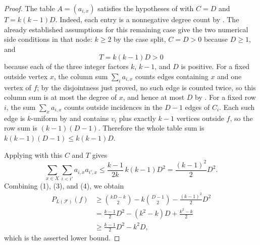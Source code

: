 \begin{proof}
The table $A=(a_{i,x})$ satisfies the hypotheses of
 with $C=D$ and $T=k(k-1)D$.  Indeed, each
entry is a nonnegative degree count by .  The
already established assumptions for this remaining case give the two
numerical side conditions in that node: $k\ge2$ by the case split,
$C=D>0$ because $D\ge1$, and
\[
T=k(k-1)D>0
\]
because each of the three integer factors $k$, $k-1$, and $D$ is positive.
For a
fixed outside vertex $x$, the column sum
$\sum_i a_{i,x}$ counts edges containing $x$ and one vertex of $f$; by the
disjointness just proved, no such edge is counted twice, so this column sum
is at most the degree of $x$, and hence at most $D$ by
.  For a fixed row $i$, the sum
$\sum_x a_{i,x}$ counts outside incidences in the $D-1$ edges of
$C_i$.  Each such edge is $k$-uniform by  and
contains $v_i$ plus exactly $k-1$ vertices outside $f$, so the row sum is
$(k-1)(D-1)$.  Therefore the whole table sum is
$k(k-1)(D-1)\le k(k-1)D$.

Applying  with this $C$ and $T$ gives
\[
\sum_{x\in X}\sum_{i<i'}a_{i,x}a_{i',x}
\le
\frac{k-1}{2k}\,k(k-1)D^2
=\frac{(k-1)^2}{2}D^2. \tag{4}
\]
Combining (1), (3), and (4), we obtain
\[
\begin{aligned}
P_{L(\mathcal F)}(f)
&\ge
\binom{kD-k}{2}
-k\binom{D-1}{2}
-\frac{(k-1)^2}{2}D^2\\
&=
\frac{k-1}{2}D^2-(k^2-k)D+\frac{k^2-k}{2}\\
&\ge \frac{k-1}{2}D^2-k^2D,
\end{aligned}
\]
which is the asserted lower bound.
\end{proof}
